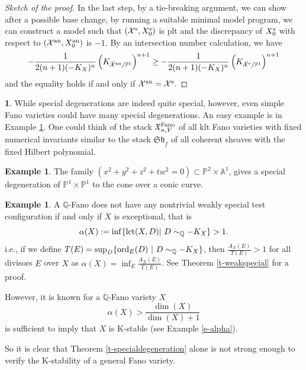\documentclass[12pt,reqno]{amsart}%
\newcommand{\cX}{{\mathcal{X}}}
\newcommand{\kX}{{\mathfrak{X}}}
\newcommand{\ord}{{\rm ord}}
\theoremstyle{definition}
\newtheorem{say}[thm]{}
\newtheorem{exmp}[thm]{Example}
\theoremstyle{remark}
\newcommand{\lct}{{\rm lct}}
\begin{document}
\begin{proof}[Sketch of the proof]
 In the last step, by a tie-breaking argument, we can show after a possible base change, by running a suitable minimal model program, we can construct a model such that $(\cX^{\rm s}, X^{\rm s}_0)$ is plt and the discrepancy of $X^{\rm s}_0$ with respect to $(\cX^{\rm an},X_0^{\rm an})$ is $-1$. By an intersection number calculation, we have 
$$ -\frac{1}{2(n+1)(-K_X)^n}\left(K_{\bar{\cX}^{\rm an}/\mathbb{P}^1}\right)^{n+1}\ge -\frac{1}{2(n+1)(-K_X)^n}\left(K_{\bar{\cX}^{\rm s}/\mathbb{P}^1}\right)^{n+1}$$
and the equality holds if and only if $\cX^{\rm an}=\cX^{\rm s}.$
\end{proof}




\begin{say}While special degenerations are indeed quite special, however, even simple Fano varieties could have many special degenerations. An easy example is in Example \ref{ex-quadratic}. One could think of the stack $\kX^{\rm Fano}_{n,V}$ of all klt Fano varieties with fixed numerical invariants similar to the stack $\mathfrak{Sh}_f$ of all coherent sheaves with the fixed Hilbert polynomial. %
\end{say}
\begin{exmp}\label{ex-quadratic}
The family $(x^2+y^2+z^2+tw^2=0)\subset \mathbb{P}^2\times \mathbb{A}^1$, gives a special degeneration of $\mathbb{P}^1\times \mathbb{P}^1$ to the cone over a conic curve. 
\end{exmp}
\begin{exmp}A $\mathbb{Q}$-Fano does not have any nontrivial weakly special test configuration if and only if $X$ is exceptional, that is
$$\alpha(X):=\inf \{\lct(X,D)| \ D\sim_{\mathbb{Q}}-K_X\}> 1.$$
i.e., if we define $T(E)=\sup_D \{\ord_{E}(D)\   | \ D\sim_{\mathbb{Q}}-K_X\}$, then $ \frac{A_{X}(E)}{T(E)}> 1$ for all divisors $E$ over $X$ as $\alpha(X)=\inf_{E} \frac{A_{X}(E)}{T(E)}$. See Theorem \ref{t-weakspecial} for a proof.
\end{exmp}

However, it is known for a $\mathbb{Q}$-Fano variety $X$ %
$$\alpha(X)>\frac{\dim(X)}{\dim(X)+1} %
$$
is sufficient to imply that $X$ is K-stable (see Example \ref{e-alpha}). 

So it is clear that Theorem \ref{t-specialdegeneration} alone is not strong enough to verify the K-stability of a general Fano variety. 
\end{document}
